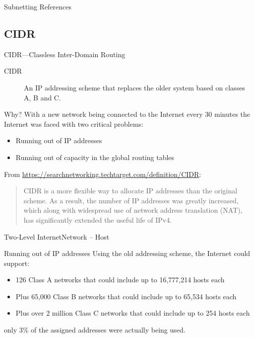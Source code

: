 \begin{frame}{Subnetting References}
  \begin{refsection}
    \nocite{wiki:subnet, wiki:ipv4subnetref,wiki:privatenet,rfc917,rfc950}
    \printbibliography[heading=none]
  \end{refsection}
\end{frame}

\subsection{CIDR}

\begin{frame}{CIDR---Classless Inter-Domain Routing}
  \begin{description}
  \item[CIDR] An IP addressing scheme that replaces the older system
    based on classes A, B and C.
  \end{description}
  \begin{iblock}{Why?}
    With a new network being connected to the Internet every 30 minutes the Internet was
    faced with two critical problems:
    \begin{itemize}
    \item Running out of IP addresses
    \item Running out of capacity in the global routing tables
    \end{itemize}
  \end{iblock}
\end{frame}

From \url{https://searchnetworking.techtarget.com/definition/CIDR}:
\begin{quote}
  CIDR is a more flexible way to allocate IP addresses than the original scheme. As a
  result, the number of IP addresses was greatly increased, which along with widespread
  use of network address translation (NAT), has significantly extended the useful life of
  IPv4.
\end{quote}

\begin{frame}{Two-Level Internet}{Network -- Host}
  \centering
  \mode<beamer>{\texttt{[image: 2-level-internet]}}%
\end{frame}

\begin{frame}{Running out of IP addresses}
  Using the old addressing scheme, the Internet could support:
  \begin{itemize}
  \item 126 Class A networks that could include up to 16,777,214 hosts each
  \item Plus 65,000 Class B networks that could include up to 65,534 hosts each
  \item Plus over 2 million Class C networks that could include up to 254 hosts each
  \end{itemize}
  only 3\% of the assigned addresses were actually being used.
\end{frame}

